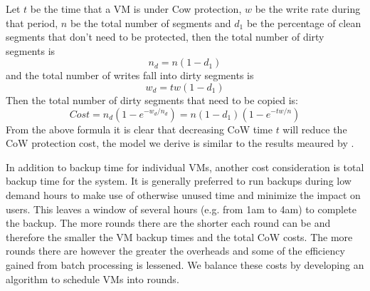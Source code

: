 Let $t$ be the time that a VM is under Cow protection, $w$ be the write rate
during that period, $n$ be the total number of segments and $d_1$ 
be the percentage of clean segments that don't need to
be protected, then the total number of dirty segments is
\[
n_d=n(1-d_1)
\]
and the total number of writes fall into dirty segments is
\[
w_d=tw(1-d_1)
\]
Then the total number of dirty segments that need to be copied is:
\[
Cost = n_d(1-e^{-w_d/n_d}) = n(1-d_1)(1-e^{-tw/n})
\]
From the above formula it is clear that decreasing CoW time $t$ will
reduce the CoW protection cost, 
the model we derive is similar to the results meaured by \cite{EMCIncrementalDataChanges}.


In addition to backup time for individual VMs, another cost consideration is
total backup time for the system. It is generally preferred to run backups
during low demand hours to make use of otherwise unused time and minimize the
impact on users. This leaves a window of several hours (e.g. from 1am to 4am)
to complete the backup. The more rounds there
are the shorter each round can be and therefore the smaller the VM backup times
and the total CoW costs. The
more rounds there are however the greater the overheads and some of the
efficiency gained from batch processing is lessened. We balance these costs by
developing an algorithm to schedule VMs into rounds.

